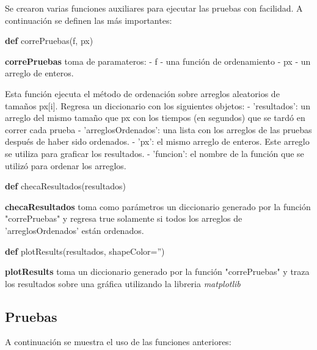 \documentclass[11pt]{article}
\newenvironment{Shaded}{}{}
\newcommand{\KeywordTok}[1]{\textcolor[rgb]{0.00,0.44,0.13}{\textbf{{#1}}}}
\newcommand{\StringTok}[1]{\textcolor[rgb]{0.25,0.44,0.63}{{#1}}}
\newcommand{\NormalTok}[1]{{#1}}
\newcommand{\OperatorTok}[1]{\textcolor[rgb]{0.40,0.40,0.40}{{#1}}}
\begin{document}
Se crearon varias funciones auxiliares para ejecutar las pruebas con
facilidad. A continuación se definen las más importantes:

\begin{Shaded}
\begin{Highlighting}[]
\KeywordTok{def}\NormalTok{ correPruebas(f, px)}
\end{Highlighting}
\end{Shaded}

\textbf{correPruebas} toma de paramateros: - f - una función de
ordenamiento - px - un arreglo de enteros.

Esta función ejecuta el método de ordenación sobre arreglos aleatorios
de tamaños px{[}i{]}. Regresa un diccionario con los siguientes objetos:
- 'resultados': un arreglo del mismo tamaño que px con los tiempos (en
segundos) que se tardó en correr cada prueba - 'arreglosOrdenados': una
lista con los arreglos de las pruebas después de haber sido ordenados. -
'px': el mismo arreglo de enteros. Este arreglo se utiliza para graficar
los resultados. - 'funcion': el nombre de la función que se utilizó para
ordenar los arreglos.

\begin{Shaded}
\begin{Highlighting}[]
\KeywordTok{def}\NormalTok{ checaResultados(resultados)}
\end{Highlighting}
\end{Shaded}

\textbf{checaResultados} toma como parámetros un diccionario generado
por la función "correPruebas" y regresa true solamente si todos los
arreglos de 'arreglosOrdenados' están ordenados.

\begin{Shaded}
\begin{Highlighting}[]
\KeywordTok{def}\NormalTok{ plotResults(resultados, shapeColor}\OperatorTok{=}\StringTok{''}\NormalTok{)}
\end{Highlighting}
\end{Shaded}

\textbf{plotResults} toma un diccionario generado por la función
"correPruebas" y traza los resultados sobre una gráfica utilizando la
libreria \emph{matplotlib}

    \subsection{Pruebas}\label{pruebas}

A continuación se muestra el uso de las funciones anteriores:
\end{document}
